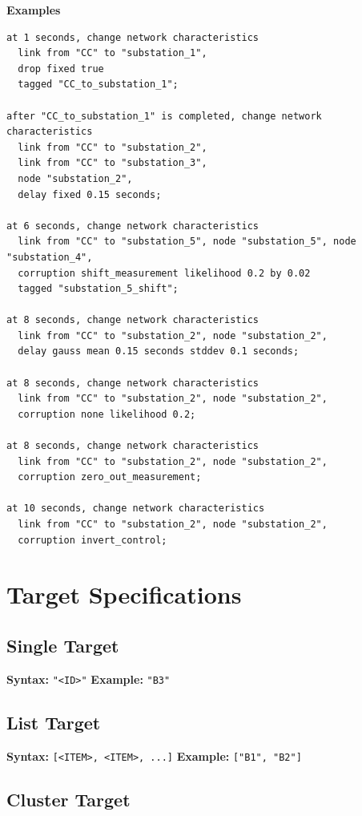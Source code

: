 \documentclass[12pt]{article}
\begin{document}
\textbf{Examples}
\begin{lstlisting}
at 1 seconds, change network characteristics
  link from "CC" to "substation_1",
  drop fixed true
  tagged "CC_to_substation_1";

after "CC_to_substation_1" is completed, change network characteristics
  link from "CC" to "substation_2",
  link from "CC" to "substation_3",
  node "substation_2",
  delay fixed 0.15 seconds;

at 6 seconds, change network characteristics
  link from "CC" to "substation_5", node "substation_5", node "substation_4",
  corruption shift_measurement likelihood 0.2 by 0.02
  tagged "substation_5_shift";

at 8 seconds, change network characteristics
  link from "CC" to "substation_2", node "substation_2",
  delay gauss mean 0.15 seconds stddev 0.1 seconds;

at 8 seconds, change network characteristics
  link from "CC" to "substation_2", node "substation_2",
  corruption none likelihood 0.2;

at 8 seconds, change network characteristics
  link from "CC" to "substation_2", node "substation_2",
  corruption zero_out_measurement;

at 10 seconds, change network characteristics
  link from "CC" to "substation_2", node "substation_2",
  corruption invert_control;
\end{lstlisting}

\section{Target Specifications}

\subsection{Single Target}

\textbf{Syntax:} \texttt{"<ID>"} \quad \textbf{Example:} \texttt{"B3"}

\subsection{List Target}

\textbf{Syntax:} \texttt{[<ITEM>, <ITEM>, ...]} \quad \textbf{Example:} \texttt{["B1", "B2"]}

\subsection{Cluster Target}
\end{document}
